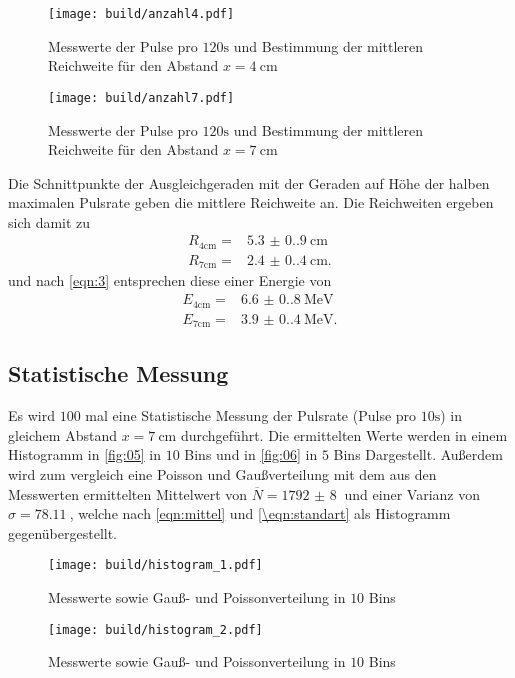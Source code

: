 \begin{figure}[H]
  \centering
  \caption{Messwerte der Pulse pro $120\unit{\second}$ und Bestimmung der mittleren Reichweite für den Abstand $x = \qty{4}{\centi\meter}$}
  \label{fig:13}
  \texttt{[image: build/anzahl4.pdf]}
\end{figure}

\begin{figure}[H]
  \centering
  \caption{Messwerte der Pulse pro $120\unit{\second}$ und Bestimmung der mittleren Reichweite für den Abstand $x = \qty{7}{\centi\meter}$}
  \label{fig:14}
  \texttt{[image: build/anzahl7.pdf]}
\end{figure}
\noindent Die Schnittpunkte der Ausgleichgeraden mit der Geraden auf Höhe der
halben maximalen Pulsrate geben die mittlere Reichweite an. Die Reichweiten
ergeben sich damit zu 
\begin{align}
  R_\text{4cm} = &\qty{5.3(0.9)}{\centi\meter} \\
  R_\text{7cm} = &\qty{2.4(0.4)}{\centi\meter}.
\end{align}
und nach \autoref{eqn:3} entsprechen diese einer Energie von
\begin{align}
  E_\text{4cm} = &\qty{6.6(0.8)}{\mega\electronvolt} \\
  E_\text{7cm} = &\qty{3.9(0.4)}{\mega\electronvolt}.
\end{align}

\subsection{Statistische Messung}
Es wird $100$ mal eine Statistische Messung der Pulsrate (Pulse pro $10\unit{\second}$) in gleichem Abstand $x=\qty{7}{\centi\meter}$ 
durchgeführt. Die ermittelten Werte werden in einem Histogramm in \autoref{fig:05} in $10$ Bins und in \autoref{fig:06} in $5$ Bins Dargestellt. 
Außerdem wird zum vergleich eine Poisson und Gaußverteilung mit dem aus den Messwerten ermittelten Mittelwert von $\overline{N} = \qty{1792(8)}{}$ und einer Varianz von 
$\sigma = \qty{78.11}{}$, welche nach \autoref{eqn:mittel} und \autoref{\eqn:standart} als Histogramm gegenübergestellt.
\begin{figure}[H]
  \centering
  \caption{Messwerte sowie Gauß- und Poissonverteilung in $10$ Bins}
  \label{fig:05}
  \texttt{[image: build/histogram\_1.pdf]}
\end{figure}
\begin{figure}[H]
  \centering
  \caption{Messwerte sowie Gauß- und Poissonverteilung in $10$ Bins}
  \label{fig:06}
  \texttt{[image: build/histogram\_2.pdf]}
\end{figure}